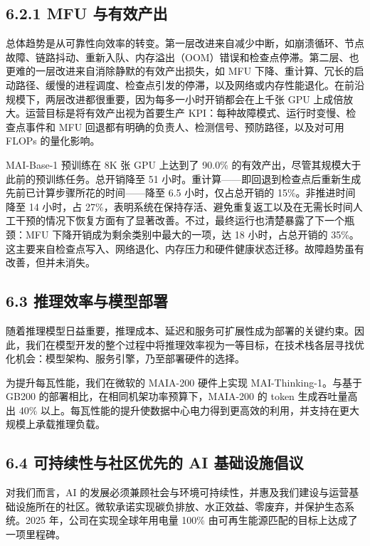 \subsection{6.2.1 MFU 与有效产出}\label{mfu-and-goodput}

总体趋势是从可靠性向效率的转变。第一层改进来自减少中断，如崩溃循环、节点故障、链路抖动、重新入队、内存溢出（OOM）错误和检查点停滞。第二层、也更难的一层改进来自消除静默的有效产出损失，如 MFU 下降、重计算、冗长的启动路径、缓慢的进程调度、检查点引发的停滞，以及网络或内存性能退化。在前沿规模下，两层改进都很重要，因为每多一小时开销都会在上千张 GPU 上成倍放大。运营目标是将有效产出视为首要生产 KPI：每种故障模式、运行时变慢、检查点事件和 MFU 回退都有明确的负责人、检测信号、预防路径，以及对可用 FLOPs 的量化影响。

MAI-Base-1 预训练在 8K 张 GPU 上达到了 90.0\% 的有效产出，尽管其规模大于此前的预训练任务。总开销降至 51 小时。重计算——即回退到检查点后重新生成先前已计算步骤所花的时间——降至 6.5 小时，仅占总开销的 15\%。非推进时间降至 14 小时，占 27\%，表明系统在保持存活、避免重复返工以及在无需长时间人工干预的情况下恢复方面有了显著改善。不过，最终运行也清楚暴露了下一个瓶颈：MFU 下降开销成为剩余类别中最大的一项，达 18 小时，占总开销的 35\%。这主要来自检查点写入、网络退化、内存压力和硬件健康状态迁移。故障趋势虽有改善，但并未消失。

\subsection{6.3 推理效率与模型部署}\label{inference-efficiency-and-model-deployment}

随着推理模型日益重要，推理成本、延迟和服务可扩展性成为部署的关键约束。因此，我们在模型开发的整个过程中将推理效率视为一等目标，在技术栈各层寻找优化机会：模型架构、服务引擎，乃至部署硬件的选择。

为提升每瓦性能，我们在微软的 MAIA-200 硬件上实现 MAI-Thinking-1。与基于 GB200 的部署相比，在相同机架功率预算下，MAIA-200 的 token 生成吞吐量高出 40\% 以上。每瓦性能的提升使数据中心电力得到更高效的利用，并支持在更大规模上承载推理负载。

\subsection{6.4 可持续性与社区优先的 AI 基础设施倡议}\label{sustainability-and-communityfirst-ai-infrastructure-initiatives}

对我们而言，AI 的发展必须兼顾社会与环境可持续性，并惠及我们建设与运营基础设施所在的社区。微软承诺实现碳负排放、水正效益、零废弃，并保护生态系统。2025 年，公司在实现全球年用电量 100\% 由可再生能源匹配的目标上达成了一项里程碑。

